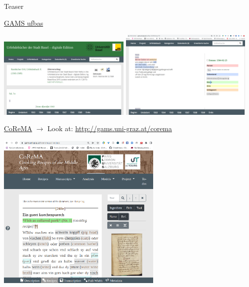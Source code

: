 \begin{frame}[allowframebreaks]{Teaser}

    \href{http://gams.uni-graz.at/o:ufbas.1563\#Eintrag-149}{GAMS ufbas}

    \includegraphics[width=0.48\textwidth]{img/ufbas1.png}
    \includegraphics[width=0.48\textwidth]{img/ufbas2.png}
    
    \framebreak
    
    \href{https://gams.uni-graz.at/o:corema.pa1.recipes}{CoReMA} $\to$
    Look at: \protect\url{http://gams.uni-graz.at/corema}
    
    \includegraphics[width=0.6\textwidth]{img/corema-b1.png}
    
    \framebreak
    

\end{frame}
